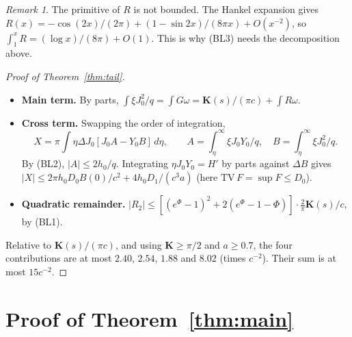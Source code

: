 \documentclass[11pt]{amsart}
\theoremstyle{remark}
\newtheorem{remark}[proposition]{Remark}
\numberwithin{equation}{section}
\newcommand{\Kell}{\mathbf{K}}
\begin{document}
\begin{remark}
The primitive of $R$ is not bounded. The Hankel expansion gives $R(x)=-\cos(2x)/(2\pi)+(1-\sin2x)/(8\pi x)+O(x^{-2})$, so $\int_1^xR=(\log x)/(8\pi)+O(1)$. This is why (BL3) needs the decomposition above.
\end{remark}

\begin{proof}[Proof of Theorem~\ref{thm:tail}]
\begin{itemize}
\item \textbf{Main term.} By parts, $\int\xi J_0^2/q=\int G\omega=\Kell(s)/(\pi c)+\int R\omega$.
\item \textbf{Cross term.} Swapping the order of integration,
\[
X=\pi\int\eta\Delta J_0[J_0A-Y_0B]\,d\eta,\qquad A=\int_\eta^\infty\xi J_0Y_0/q,\quad B=\int_\eta^\infty\xi J_0^2/q.
\]
By (BL2), $|A|\le2h_0/q$. Integrating $\eta J_0Y_0=H'$ by parts against $\Delta B$ gives $|X|\le2\pi h_0D_0B(0)/c^2+4h_0D_1/(c^3a)$ (here $\mathrm{TV}\,F=\sup F\le D_0$).
\item \textbf{Quadratic remainder.} $|R_2|\le[(e^\Phi-1)^2+2(e^\Phi-1-\Phi)]\cdot\frac2\pi\Kell(s)/c$, by (BL1).
\end{itemize}
Relative to $\Kell(s)/(\pi c)$, and using $\Kell\ge\pi/2$ and $a\ge0.7$, the four contributions are at most $2.40$, $2.54$, $1.88$ and $8.02$ (times $c^{-2}$). Their sum is at most $15c^{-2}$.
\end{proof}

\section{Proof of Theorem~\ref{thm:main}}\label{sec:main}
\end{document}
